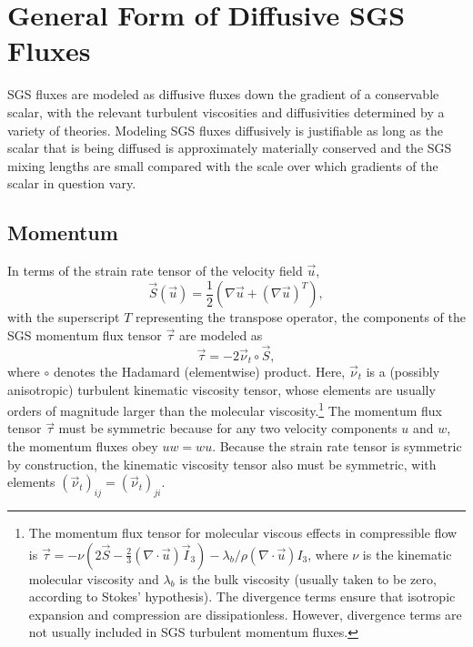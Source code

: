 \documentclass{report}
\begin{document}
\section{General Form of Diffusive SGS Fluxes}\label{s:sgs_fluxes_form}

SGS fluxes are modeled as diffusive fluxes down the gradient of a conservable scalar, with the relevant turbulent viscosities and diffusivities determined by a variety of theories. Modeling SGS fluxes diffusively is justifiable as long as the scalar that is being diffused is approximately materially conserved and the SGS mixing lengths are small compared with the scale over which gradients of the scalar in question vary. 

\subsection{Momentum}

In terms of the strain rate tensor of the velocity field $\vec{u}$,
\begin{equation}
\vec{S}(\vec{u}) = \frac{1}{2}  \left(\nabla \vec{u} +  \left( \nabla \vec{u} \right)^T \right),
\end{equation}
with the superscript $T$ representing the transpose operator, the components of the SGS momentum flux tensor $\vec{\tau}$ are modeled as
\begin{equation}\label{e:sgs_momentum_flux}
\vec{\tau} =  - 2 \vec{\nu}_t \circ \vec{S},
\end{equation}
where $\circ$ denotes the Hadamard (elementwise) product. Here, $\vec{\nu}_t$ is a (possibly anisotropic) turbulent kinematic viscosity tensor, whose elements are usually orders of magnitude larger than the molecular viscosity.\footnote{The momentum flux tensor for molecular viscous effects in compressible flow is $\vec{\tau}  =  - \nu \left( 2\vec{S}  - \frac{2}{3} (\nabla \cdot \vec{u}) \vec{I}_3 \right) - \lambda_b/\rho (\nabla \cdot \vec{u}) I_3$, where $\nu$ is the kinematic molecular viscosity and $\lambda_b$ is the bulk viscosity (usually taken to be zero, according to Stokes' hypothesis). The divergence terms ensure that isotropic expansion and compression are dissipationless. However, divergence terms are not usually included in SGS turbulent momentum fluxes.} The momentum flux tensor $\vec{\tau}$ must be symmetric because for any two velocity components $u$ and $w$, the momentum fluxes obey $uw = wu$. Because the strain rate tensor is symmetric by construction, the kinematic viscosity tensor also must be symmetric, with elements $(\vec{\nu}_t)_{ij} = (\vec{\nu}_t)_{ji}$.
\end{document}
